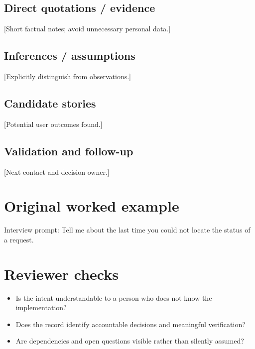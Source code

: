 \documentclass[11pt,letterpaper]{article}
\begin{document}
\subsection{Direct quotations / evidence}
[Short factual notes; avoid unnecessary personal data.]

\subsection{Inferences / assumptions}
[Explicitly distinguish from observations.]

\subsection{Candidate stories}
[Potential user outcomes found.]

\subsection{Validation and follow-up}
[Next contact and decision owner.]

\section{Original worked example}
\begin{tcolorbox}[colback=tealback,colframe=navy,title={Illustrative entry},breakable]
Interview prompt: Tell me about the last time you could not locate the status of a request.

\end{tcolorbox}
\section{Reviewer checks}
\begin{itemize}[leftmargin=*,itemsep=2pt]
\item Is the intent understandable to a person who does not know the implementation?
\item Does the record identify accountable decisions and meaningful verification?
\item Are dependencies and open questions visible rather than silently assumed?
\end{itemize}
\end{document}
